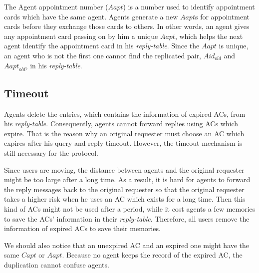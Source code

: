 \noindent The Agent appointment number ($Aapt$) is a number used to identify appointment cards which have the same agent. Agents generate a new $Aapt$s for appointment cards before they exchange those cards to others. In other words, an agent gives any appointment card passing on by him a unique $Aapt$, which helps the next agent identify the appointment card in his \textit{reply-table}. Since the $Aapt$ is unique, an agent who is not the first one cannot find the replicated pair, ${Aid}_{old}$ and ${Aapt}_{old}$, in his \textit{reply-table}.


\subsection{ Timeout}

\noindent Agents delete the entries, which contains the information of expired ACs, from his \textit{reply-table}. Consequently, agents cannot forward replies using ACs which expire. That is the reason why an original requester must choose an AC which expires after his query and reply timeout. However, the timeout mechanism is still necessary for the protocol.

Since users are moving, the distance between agents and the original requester might be too large after a long time. As a result, it is hard for agents to forward the reply messages back to the original requester so that the original requester takes a higher risk when he uses an AC which exists for a long time. Then this kind of ACs might not be used after a period, while it cost agents a few memories to save the ACs' information in their \textit{reply-table}. Therefore, all users remove the information of expired ACs to save their memories.

We should also notice that an unexpired AC and an expired one might have the same $Capt$ or $Aapt$. Because no agent keeps the record of the expired AC, the duplication cannot confuse agents.




































